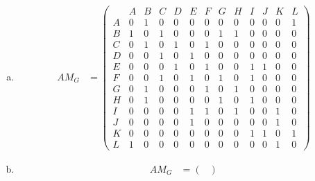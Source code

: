 \documentclass[10pt,letterpaper, cm]{hmcpset}
\begin{document}
\begin{enumerate}[(a)]

    \item 
    
    \begin{align*}

      AM_G &= \begin{pmatrix}


             & A & B & C & D & E & F & G & H & I & J & K & L \\        

         A   & 0 & 1 & 0 & 0 & 0 & 0 & 0 & 0 & 0 & 0 & 0 & 1 \\

         B   & 1 & 0 & 1 & 0 & 0 & 0 & 1 & 1 & 0 & 0 & 0 & 0\\

         C   & 0 & 1 & 0 & 1 & 0 & 1 & 0 & 0 & 0  & 0 & 0 & 0\\

         D   & 0 & 0 & 1 & 0 & 1 & 0 & 0 & 0 & 0  & 0 & 0 & 0 \\

         E   & 0 & 0 & 0 & 1 & 0 & 1 & 0 & 0 & 1 & 1 & 0 & 0\\

         F   & 0 & 0 & 1 & 0 & 1 & 0 & 1 & 0 & 1 & 0 & 0 & 0 \\

         G   & 0 & 1 & 0 & 0 & 0 & 1 & 0 & 1 & 0 & 0 & 0 & 0\\

         H   & 0 & 1 & 0 & 0 & 0 & 0 & 1 & 0 & 1 & 0 & 0 & 0\\

         I   & 0 & 0 & 0 & 0 & 1 & 1 & 0 & 1 & 0 & 0 & 1 & 0\\
          
         J   & 0 & 0 & 0 & 0 & 1 & 0 & 0 & 0 & 0 & 0 & 1 & 0 \\

         K   & 0 & 0 & 0 & 0 & 0 & 0 & 0 & 0 & 1 & 1 & 0 & 1 \\

         L   & 1 & 0 & 0 & 0 & 0 & 0 & 0 & 0 & 0 & 0 & 1 & 0
      \end{pmatrix}  
              \end{align*}
    \item 
    
    \begin{align*}

      AM_G &= \begin{pmatrix}



\end{pmatrix}
\end{align*}
\end{enumerate}
\end{document}
